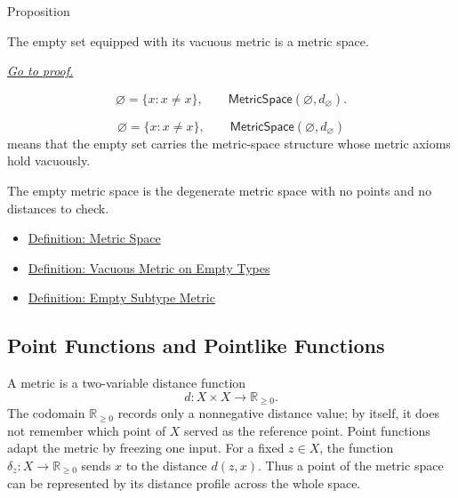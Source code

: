 \begin{propositionbox}{Proposition}
\begin{proposition}
\label{prop:empty-set-metric-space}
The empty set equipped with its vacuous metric is a metric space.

\smallskip
\noindent
\hyperref[prf:empty-set-metric-space]{\textit{Go to proof.}}
\end{proposition}
\end{propositionbox}

\begin{remark*}
\[
  \varnothing=\{x:x\neq x\},
  \qquad
  \mathsf{MetricSpace}(\varnothing,d_{\varnothing}).
\]
\end{remark*}

\begin{remark*}
\[
\varnothing=\{x:x\neq x\},
\qquad
\mathsf{MetricSpace}(\varnothing,d_{\varnothing})
\]
means that the empty set carries the metric-space structure whose metric
axioms hold vacuously.
\end{remark*}

\begin{remark*}[Interpretation]
The empty metric space is the degenerate metric space with no points and no
distances to check.
\end{remark*}


\begin{dependencies}
\begin{itemize}
  \item \hyperref[def:metric-space]{Definition: Metric Space}
  \item \hyperref[def:vacuous-metric-empty-types]{Definition: Vacuous Metric on Empty Types}
  \item \hyperref[def:empty-subtype-metric]{Definition: Empty Subtype Metric}
\end{itemize}
\end{dependencies}

\subsection{Point Functions and Pointlike Functions}

\begin{remark*}[Exposition]
A metric is a two-variable distance function
\[
  d:X\times X\to\mathbb{R}_{\geq 0}.
\]
The codomain \(\mathbb{R}_{\geq 0}\) records only a nonnegative distance
value; by itself, it does not remember which point of \(X\) served as the
reference point.  Point functions adapt the metric by freezing one input.
For a fixed \(z\in X\), the function \(\delta_z:X\to\mathbb{R}_{\geq 0}\)
sends \(x\) to the distance \(d(z,x)\).  Thus a point of the metric space can
be represented by its distance profile across the whole space.
\end{remark*}

